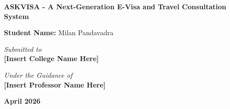 \documentclass[12pt, a4paper]{article}
\begin{document}
\begin{titlepage}
    \centering
    \vspace*{2cm}
    
    \Huge
    \textbf{ASKVISA - A Next-Generation E-Visa and Travel Consultation System}
    
    \vspace{2cm}
    
    \Large
    \textbf{Student Name:} Milan Pandavadra
    
    \vspace{1.5cm}
    
    \textit{Submitted to} \\
    \vspace{0.5cm}
    \textbf{[Insert College Name Here]}
    
    \vspace{1.5cm}
    
    \textit{Under the Guidance of} \\
    \vspace{0.5cm}
    \textbf{[Insert Professor Name Here]}
    
    \vfill
    
    \large
    \textbf{April 2026}
\end{titlepage}

\newpage
\end{document}
